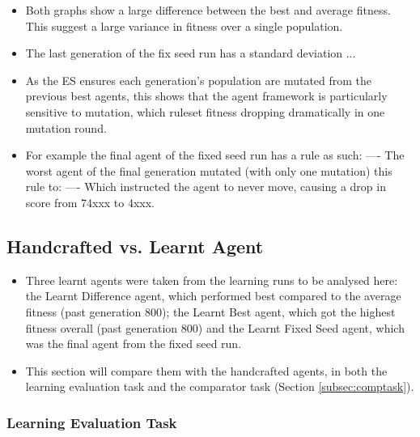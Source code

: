 \begin{itemize}
\item Both graphs show a large difference between the best and average fitness. This suggest a large variance in fitness over a single population.
\item The last generation of the fix seed run has a standard deviation ...
\item As the ES ensures each generation's population are mutated from the previous best agents, this shows that the agent framework is particularly sensitive to mutation, which ruleset fitness dropping dramatically in one mutation round.
\item For example the final agent of the fixed seed run has a rule as such: ---- The worst agent of the final generation mutated (with only one mutation) this rule to: ---- Which instructed the agent to never move, causing a drop in score from 74xxx to 4xxx.
\end{itemize}

\clearpage

\subsection{Handcrafted vs. Learnt Agent}
\label{subsec:evallearnt}

\begin{itemize}
\item Three learnt agents were taken from the learning runs to be analysed here: the Learnt Difference agent, which performed best compared to the average fitness (past generation 800); the Learnt Best agent, which got the highest fitness overall (past generation 800) and the Learnt Fixed Seed agent, which was the final agent from the fixed seed run.
\item This section will compare them with the handcrafted agents, in both the learning evaluation task and the comparator task (Section \ref{subsec:comptask}).
\end{itemize}

\subsubsection{Learning Evaluation Task}

